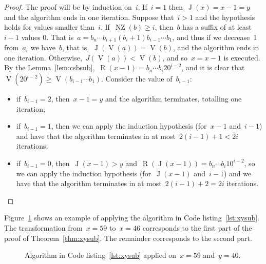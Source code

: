 \documentclass[main.tex]{subfiles}
\newcommand{\NZ}{\operatorname{NZ}}
\newcommand{\CSB}{\textit{CSB}}
\renewcommand{\V}{\operatorname{V}}
\newcommand{\R}{\operatorname{R}}
\newcommand{\J}{\operatorname{J}}
\begin{document}
\begin{proof}
	The proof will be by induction on~$i$. If~$i = 1$ then~${\J(x) = x - 1 = y}$ and the algorithm ends in one iteration.
	Suppose that~$i > 1$ and the hypothesis holds for values smaller than~$i$. If~${\NZ(b) \geq i}$, then~$b$ has a suffix of at least~$i - 1$ values 0. That is~${a = b_n \cdots b_{i + 1} (b_{i} + 1) b_{i - 1} \cdots b_1}$, and thus if we decrease~1 from~$a_{i}$ we have~$b$, that is,~${\J(\V(a)) = \V(b)}$, and the algorithm ends in one iteration.
	Otherwise,~${J(\V(a)) < \V(b)}$, and so~$x = x - 1$ is executed. By the Lemma~\ref{lem:csbsub},~${\R(x - 1) = b_n \cdots b_i 2 0^{i-2}}$, and it is clear that~${\V(20^{i-2}) \geq \V(b_{i-1} \cdots b_1)}$. Consider the value of~$b_{i-1}$:
	\begin{itemize}
		\item if~$b_{i-1} = 2$, then~$x - 1 = y$ and the algorithm terminates, totalling one iteration;
		\item if~$b_{i-1} = 1$, then we can apply the induction hypothesis (for~$x - 1$ and~$i - 1$) and have that the algorithm terminates in at most~$2(i - 1) + 1 < 2i$ iterations;
		\item if~$b_{i-1} = 0$, then~$\J(x - 1) > y$ and~$\R(\J(x - 1)) = b_n \cdots b_i 1 0^{i-2}$, so we can apply the induction hypothesis (for~$\J(x-1)$ and~$i-1$) and we have that the algorithm terminates in at most~$2(i-1) + 2 = 2i$ iterations.
	\end{itemize}
\end{proof}

Figure~\ref{fig:exxysub} shows an example of applying the algorithm in Code listing~\ref{lst:xysub}. The transformation from~$x = 59$ to~$x = 46$ corresponds to the first part of the proof of Theorem~\ref{thm:xysub}. The remainder corresponds to the second part.

\begin{figure}[H]
\caption{Algorithm in Code listing~\ref{lst:xysub} applied on~$x = 59$ and~$y = 40$.} \label{fig:exxysub}
\end{figure}
\end{document}

